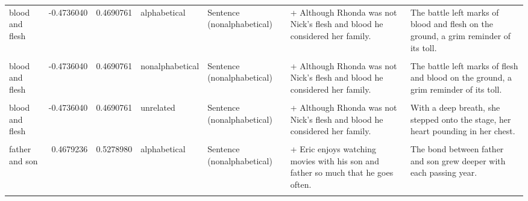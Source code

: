 \documentclass[
  12pt,
]{scrartcl}
\begin{document}
\begin{landscape}
\begin{longtable}{lrrllll}
blood and flesh & -0.4736040 & 0.4690761 & alphabetical & Sentence (nonalphabetical) & + Although Rhonda was not Nick's flesh and blood he considered her family. & The battle left marks of blood and flesh on the ground, a grim reminder of its toll.\\
\cellcolor{gray!6}{blood and flesh} & \cellcolor{gray!6}{-0.4736040} & \cellcolor{gray!6}{0.4690761} & \cellcolor{gray!6}{nonalphabetical} & \cellcolor{gray!6}{Sentence (alphabetical)} & \cellcolor{gray!6}{+ Although Rhonda was not Nick's blood and flesh he considered her family.} & \cellcolor{gray!6}{The battle left marks of flesh and blood on the ground, a grim reminder of its toll.}\\
\addlinespace
blood and flesh & -0.4736040 & 0.4690761 & nonalphabetical & Sentence (nonalphabetical) & + Although Rhonda was not Nick's flesh and blood he considered her family. & The battle left marks of flesh and blood on the ground, a grim reminder of its toll.\\
\cellcolor{gray!6}{blood and flesh} & \cellcolor{gray!6}{-0.4736040} & \cellcolor{gray!6}{0.4690761} & \cellcolor{gray!6}{unrelated} & \cellcolor{gray!6}{Sentence (alphabetical)} & \cellcolor{gray!6}{+ Although Rhonda was not Nick's blood and flesh he considered her family.} & \cellcolor{gray!6}{With a deep breath, she stepped onto the stage, her heart pounding in her chest.}\\
blood and flesh & -0.4736040 & 0.4690761 & unrelated & Sentence (nonalphabetical) & + Although Rhonda was not Nick's flesh and blood he considered her family. & With a deep breath, she stepped onto the stage, her heart pounding in her chest.\\
\cellcolor{gray!6}{father and son} & \cellcolor{gray!6}{0.4679236} & \cellcolor{gray!6}{0.5278980} & \cellcolor{gray!6}{alphabetical} & \cellcolor{gray!6}{Sentence (alphabetical)} & \cellcolor{gray!6}{+ Eric enjoys watching movies with his father and son so much that he goes often.} & \cellcolor{gray!6}{The bond between father and son grew deeper with each passing year.}\\
father and son & 0.4679236 & 0.5278980 & alphabetical & Sentence (nonalphabetical) & + Eric enjoys watching movies with his son and father so much that he goes often. & The bond between father and son grew deeper with each passing year.\\
\addlinespace
\cellcolor{gray!6}{father and son} & \cellcolor{gray!6}{0.4679236} & \cellcolor{gray!6}{0.5278980} & \cellcolor{gray!6}{nonalphabetical} & \cellcolor{gray!6}{Sentence (alphabetical)} & \cellcolor{gray!6}{+ Eric enjoys watching movies with his father and son so much that he goes often.} & \cellcolor{gray!6}{The bond between son and father grew deeper with each passing year.}\\

\end{longtable}
\end{landscape}
\end{document}
